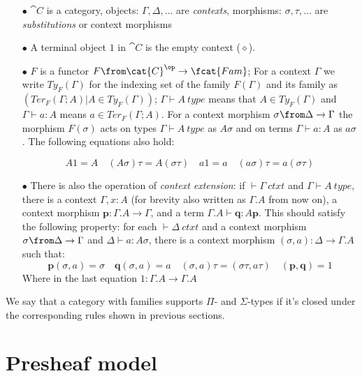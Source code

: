 \begin{itemize}
  \item[$\bullet$] $\cat{C}$ is a category, objects: $\Gamma, \Delta, \dots$ are
    \emph{contexts}, morphisms:  $\sigma, \tau, \dots$ are
    \emph{substitutions} or context morphisms

  \item[$\bullet$] A terminal object $1$ in $\cat{C}$ is the empty context ($\diamond$).

  \item[$\bullet$] $F$ is a functor $F\from \cat{C}^\op \to \fcat{Fam}$; For a
    context $\Gamma$ we write $Ty_F(\Gamma)$ for the indexing set of the family
    $F(\Gamma)$ and its family as $(Ter_F(\Gamma;A) | A \in Ty_F(\Gamma))$;
    $\Gamma \vdash A~type$ means that $A \in Ty_F(\Gamma)$ and $\Gamma \vdash a
    : A$ means $a \in Ter_F(\Gamma;A)$. For a context morphism $\sigma \from
    \Delta \to \Gamma$ the morphism $F(\sigma)$ acts on types $\Gamma \vdash
    A~type$ as $A\sigma$ and on terms $\Gamma \vdash a : A$ as $a\sigma$. The
    following equations also hold:

    \[
      A1=A \quad (A\sigma)\tau = A(\sigma\tau) \quad a1=a \quad (a\sigma)\tau=a(\sigma\tau)
    \]

  \item[$\bullet$] There is also the operation of \emph{context extension}: if
    $\vdash \Gamma~ctxt$ and $\Gamma \vdash A~type$, there is a context
    $\Gamma, x:A$ (for brevity also written as $\Gamma.A$ from now on), a
    context morphism $\mathbf{p}: \Gamma.A \to \Gamma$, and a term $\Gamma.A
    \vdash \mathbf{q} : A \mathbf{p}$. This should satisfy the following
    property: for each $\vdash \Delta~ctxt$ and a context morphism
    $\sigma \from \Delta \to \Gamma$ and $\Delta \vdash a : A \sigma$, there is
    a context morphism $(\sigma, a): \Delta \to \Gamma.A$ such that:
    \[
      \mathbf{p}(\sigma, a) = \sigma \quad \mathbf{q}(\sigma, a) = a \quad (\sigma, a) \tau =
      (\sigma \tau, a \tau) \quad (\mathbf{p}, \mathbf{q}) = 1
    \]
    Where in the last equation $1: \Gamma.A \to \Gamma.A$
\end{itemize}

We say that a category with families supports $\Pi$- and $\Sigma$-types if it's
closed under the corresponding rules shown in previous sections.

\section*{Presheaf model}

